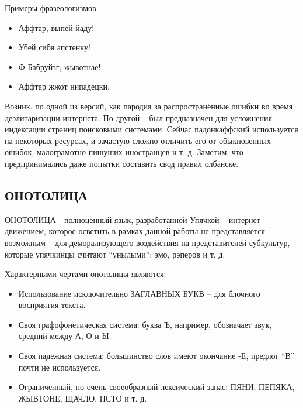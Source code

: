 Примеры фразеологизмов:

\begin{itemize}

\item Аффтар, выпей йаду!

\item Убей сибя апстенку!

\item Ф Бабруйзг, жывотнае!

\item Аффтар жжот нипадецки.

\end{itemize}

Возник, по одной из версий, как пародия за распространённые ошибки во время деэлитаризации интернета. По другой -- был предназначен для усложнения индексации страниц поисковыми системами. Сейчас падонкаффский используется на некоторых ресурсах, и зачастую сложно отличить его от обыкновенных ошибок, малограмотно пишуших иностранцев и т. д.
Заметим, что предпринимались даже попытки составить свод правил олбанске.

\subsection{ОНОТОЛИЦА}

ОНОТОЛИЦА - полноценный язык, разработанной Упячкой -- интернет-движением, которое осветить в рамках данной работы не представляется возможным -- для деморализующего воздействия на представителей субкультур, которые упячкинцы считают ``унылыми'': эмо, рэперов и т. д. 

Характерными чертами онотолицы являются:

\begin{itemize}

\item Использование исключительно ЗАГЛАВНЫХ БУКВ -- для блочного восприятия текста.

\item Своя графофонетическая система: буква Ъ, например, обозначает звук, средний между А, О и Ы.

\item Своя падежная система: большинство слов имеют окончание -Е, предлог ``В'' почти не используется.

\item Ограниченный, но очень своеобразный лексический запас: ПЯНИ, ПЕПЯКА, ЖЫВТОНЕ, ЩАЧЛО, ПСТО и т. д.

\end{itemize}

